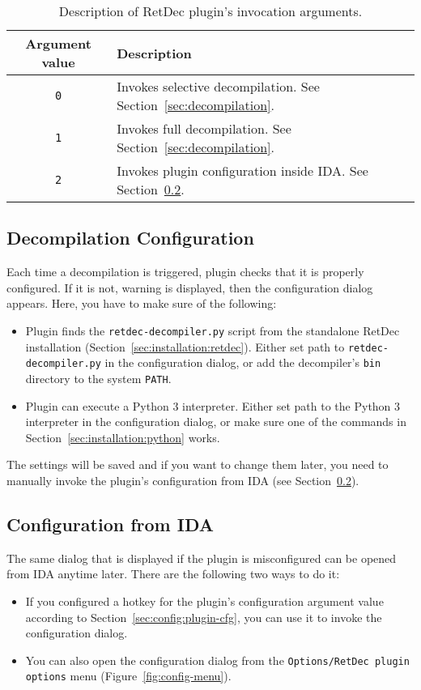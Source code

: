 \documentclass[pdftex, a4paper,12pt, oneside, svgnames]{article}
\begin{document}
\begin{table}[!ht]
\centering
\caption{Description of RetDec plugin's invocation arguments.}
\label{table:plugin-args}
\begin{tabular}{cl}
\textbf{Argument value} & \textbf{Description}\\
\hline
\texttt{0} & Invokes selective decompilation. See Section~\ref{sec:decompilation}. \\
\texttt{1} & Invokes full decompilation. See Section~\ref{sec:decompilation}. \\
\texttt{2} & Invokes plugin configuration inside IDA. See Section~\ref{sec:config:from-ida}.
\end{tabular}
\end{table}

\subsection{Decompilation Configuration}
\label{sec:config:decompilation}
Each time a decompilation is triggered, plugin checks that it is properly configured. If it is not, warning is displayed, then the configuration dialog appears. Here, you have to make sure of the following:
\begin{itemize}
    \item Plugin finds the \texttt{retdec-decompiler.py} script from the standalone RetDec installation (Section~\ref{sec:installation:retdec}). Either set path to \texttt{retdec-decompiler.py} in the configuration dialog, or add the decompiler's \texttt{bin} directory to the system \texttt{PATH}.
    \item Plugin can execute a Python 3 interpreter. Either set path to the Python 3 interpreter in the configuration dialog, or make sure one of the commands in Section~\ref{sec:installation:python} works.
\end{itemize}

The settings will be saved and if you want to change them later, you need to manually invoke the plugin's configuration from IDA (see Section~\ref{sec:config:from-ida}).

\subsection{Configuration from IDA}
\label{sec:config:from-ida}
The same dialog that is displayed if the plugin is misconfigured can be opened from IDA anytime later. There are the following two ways to do it:
\begin{itemize}
	\item If you configured a hotkey for the plugin's configuration argument value according to Section~\ref{sec:config:plugin-cfg}, you can use it to invoke the configuration dialog.
	\item You can also open the configuration dialog from the \texttt{Options/RetDec plugin options} menu (Figure~\ref{fig:config-menu}).
\end{itemize}
\end{document}

